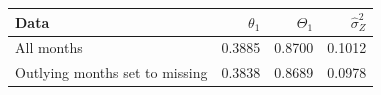 \begin{tabular}{lrrr}
\toprule
Data & $\theta_1$ & $\Theta_1$ & $\hat\sigma^2_Z$\\
\midrule
All months & 0.3885 & 0.8700 & 0.1012\\
Outlying months set to missing & 0.3838 & 0.8689 & 0.0978\\
\bottomrule
\end{tabular}

